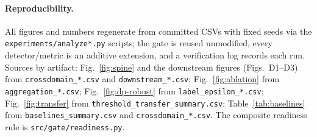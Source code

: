 \documentclass[11pt]{article}
\begin{document}
\paragraph{Reproducibility.} All figures and numbers regenerate from committed
CSVs with fixed seeds via the \texttt{experiments/analyze*.py} scripts; the gate is
reused unmodified, every detector/metric is an additive extension, and a
verification log records each run. Sources by artifact:
Fig.~\ref{fig:spine} and the downstream figures (Figs.~D1--D3) from
\texttt{crossdomain\_*.csv} and \texttt{downstream\_*.csv};
Fig.~\ref{fig:ablation} from \texttt{aggregation\_*.csv};
Fig.~\ref{fig:dp-robust} from \texttt{label\_epsilon\_*.csv};
Fig.~\ref{fig:transfer} from \texttt{threshold\_transfer\_summary.csv};
Table~\ref{tab:baselines} from \texttt{baselines\_summary.csv} and
\texttt{crossdomain\_*.csv}. The composite readiness rule is
\texttt{src/gate/readiness.py}.



\end{document}
